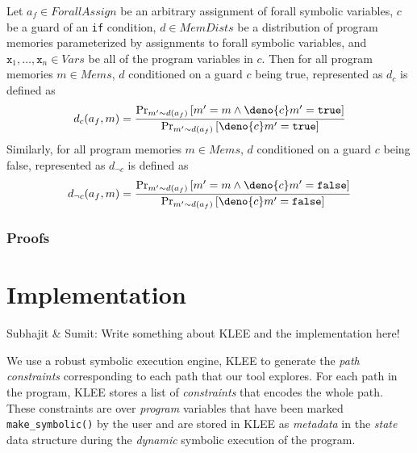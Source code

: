 \documentclass[acmsmall]{acmart}\settopmatter{}
\begin{document}
	\begin{definition}
		\label{def:cond}
		Let $a_f \in ForallAssign$ be an arbitrary assignment of forall symbolic variables, $c$ be a guard of an \texttt{if} condition, $d \in MemDists$ be a distribution of program memories parameterized by assignments to forall symbolic variables, and $\mathtt{x}_1,\ldots,\mathtt{x}_n \in Vars$ be all of the program variables in $c$. Then for all program memories $m \in Mems$, $d$ conditioned on a guard $c$ being true, represented as $d_c$ is defined as
		\[
		d_c(a_f,m) = \frac{\Pr_{m' \sim d(a_f)}\left[ m' = m \land \deno{c}m' = \mathtt{true} \right]}{\Pr_{m' \sim d(a_f)}\left[ \deno{c}m' = \mathtt{true} \right]}
		\]
		Similarly, for all program memories $m \in Mems$, $d$ conditioned on a guard $c$ being false, represented as $d_{\neg c}$ is defined as
		\[
		d_{\neg c}(a_f,m) = \frac{\Pr_{m' \sim d(a_f)}\left[ m' = m \land \deno{c}m' = \mathtt{false} \right]}{\Pr_{m' \sim d(a_f)}\left[ \deno{c}m' = \mathtt{false} \right]}
		\]
	\end{definition}
	
	\subsubsection{Proofs}
	\label{sec:proofs}
	
	\section{Implementation}
	\label{sec:implementation}
	
	{\color{red} Subhajit \& Sumit: Write something about KLEE and the implementation here!} 
	
	We use a robust symbolic execution engine, \textsc{KLEE} to generate the \textit{path constraints} corresponding to each path that our tool explores. For each path in the program, \textsc{KLEE} stores a list of \textit{constraints} that encodes the whole path. These constraints are over \textit{program} variables that have been marked \texttt{make\_symbolic()} by the user and are stored in \textsc{KLEE} as \textit{metadata} in the \textit{state} data structure during the \textit{dynamic} symbolic execution of the program.
	
\end{document}
